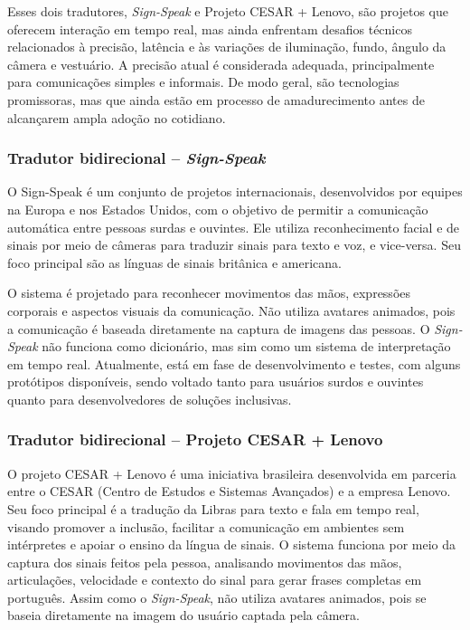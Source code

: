 \documentclass[portuguese]{textolivre}
\begin{document}
Esses dois tradutores, \textit{Sign-Speak} e Projeto CESAR + Lenovo, são projetos que oferecem interação em tempo real, mas ainda enfrentam desafios técnicos relacionados à precisão, latência e às variações de iluminação, fundo, ângulo da câmera e vestuário. A precisão atual é considerada adequada, principalmente para comunicações simples e informais. De modo geral, são tecnologias promissoras, mas que ainda estão em processo de amadurecimento antes de alcançarem ampla adoção no cotidiano.

\subsubsection{Tradutor bidirecional – \textit{Sign-Speak}}
O Sign-Speak é um conjunto de projetos internacionais, desenvolvidos por equipes na Europa e nos Estados Unidos, com o objetivo de permitir a comunicação automática entre pessoas surdas e ouvintes. Ele utiliza reconhecimento facial e de sinais por meio de câmeras para traduzir sinais para texto e voz, e vice-versa. Seu foco principal são as línguas de sinais britânica e americana.

O sistema é projetado para reconhecer movimentos das mãos, expressões corporais e aspectos visuais da comunicação. Não utiliza avatares animados, pois a comunicação é baseada diretamente na captura de imagens das pessoas. O \textit{Sign-Speak} não funciona como dicionário, mas sim como um sistema de interpretação em tempo real. Atualmente, está em fase de desenvolvimento e testes, com alguns protótipos disponíveis, sendo voltado tanto para usuários surdos e ouvintes quanto para desenvolvedores de soluções inclusivas.

\subsubsection{Tradutor bidirecional – Projeto CESAR + Lenovo}

O projeto CESAR + Lenovo é uma iniciativa brasileira desenvolvida em parceria entre o CESAR (Centro de Estudos e Sistemas Avançados) e a empresa Lenovo. Seu foco principal é a tradução da Libras para texto e fala em tempo real, visando promover a inclusão, facilitar a comunicação em ambientes sem intérpretes e apoiar o ensino da língua de sinais. O sistema funciona por meio da captura dos sinais feitos pela pessoa, analisando movimentos das mãos, articulações, velocidade e contexto do sinal para gerar frases completas em português. Assim como o \textit{Sign-Speak}, não utiliza avatares animados, pois se baseia diretamente na imagem do usuário captada pela câmera.
\end{document}
